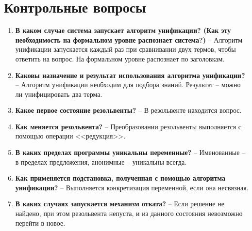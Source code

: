 \chapter{Контрольные вопросы}
\begin{enumerate}
	\item \textbf{В каком случае система запускает алгоритм унификации? (Как эту необходимость на формальном уровне распознает система?)} -- Алгоритм унификации запускается каждый раз при сравнивании двух термов, чтобы ответить на вопрос. На формальном уровне распознает по заголовкам.
	\item \textbf{Каковы назначение и результат использования алгоритма унификации?} -- Алгоритм унификации необходим для подбора знаний. Результат -- можно ли унифицировать два терма.
	\item \textbf{Какое первое состояние резольвенты?} -- В резольвенте находится вопрос.
	\item \textbf{Как меняется резольвента?} -- Преобразовании резольвенты выполняется с помощью операции <<редукция>>.
	\item \textbf{В каких пределах программы уникальны переменные?} -- Именованные -- в пределах предложения, анонимные -- уникальны всегда.
	\item \textbf{Как применяется подстановка, полученная с помощью алгоритма унификации?} -- Выполняется конкретизация переменной, если она несвязная.
	\item \textbf{В каких случаях запускается механизм отката?} -- Если решение не найдено, при этом резольвента непуста, и из данного состояния невозможно перейти в новое.
\end{enumerate}